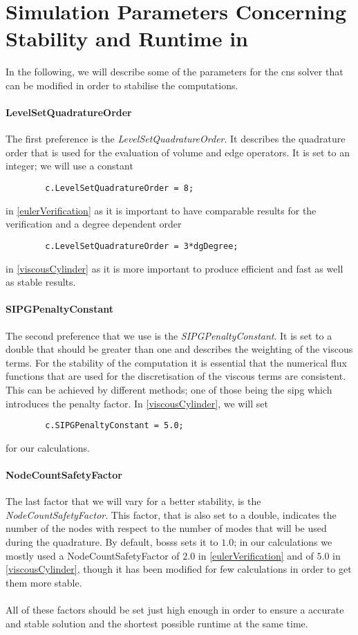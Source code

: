 	\newpage
	\section{Simulation Parameters Concerning Stability and Runtime in }
	\label{parameters}
	
	In the following, we will describe some of the parameters for the \gls{cns} solver that can be modified in order to stabilise the computations. 
	
	\paragraph{LevelSetQuadratureOrder}
	The first preference is the \textit{LevelSetQuadratureOrder}. It describes the quadrature order that is used for the evaluation of volume and edge operators. It is set to an integer; we will use a constant
	\begin{lstlisting}
		c.LevelSetQuadratureOrder = 8;
	\end{lstlisting}
	in \cref{eulerVerification} as it is important to have comparable results for the verification and a degree dependent order
	\begin{lstlisting}
		c.LevelSetQuadratureOrder = 3*dgDegree;
	\end{lstlisting}
	in \cref{viscousCylinder} as it is more important to produce efficient and fast as well as stable results. 
	
	\paragraph{SIPGPenaltyConstant}
	 The second preference that we use is the \textit{SIPGPenaltyConstant}. It is set to a double that should be greater than one and describes the weighting of the viscous terms. For the stability of the computation it is essential that the numerical flux functions that are used for the discretisation of the viscous terms are consistent. This can be achieved by different methods; one of those being the \gls{sipg} which introduces the penalty factor. In \cref{viscousCylinder}, we will set 
	 \begin{lstlisting}
		c.SIPGPenaltyConstant = 5.0;
	 \end{lstlisting}
	for our calculations.
		 
	\paragraph{NodeCountSafetyFactor}
	The last factor that we will vary for a better stability, is the \textit{NodeCountSafetyFactor}. This factor, that is also set to a double, indicates the number of the nodes with respect to the number of modes that will be used during the quadrature. By default, \gls{bosss} sets it to $1.0$; in our calculations we mostly used a NodeCountSafetyFactor of $2.0$  in \cref{eulerVerification} and of $5.0$ in \cref{viscousCylinder}, though it has been modified for few calculations in order to get them more stable.\\\\
	
     All of these factors should be set just high enough in order to ensure a accurate and stable solution and the shortest possible runtime at the same time. 
     

	